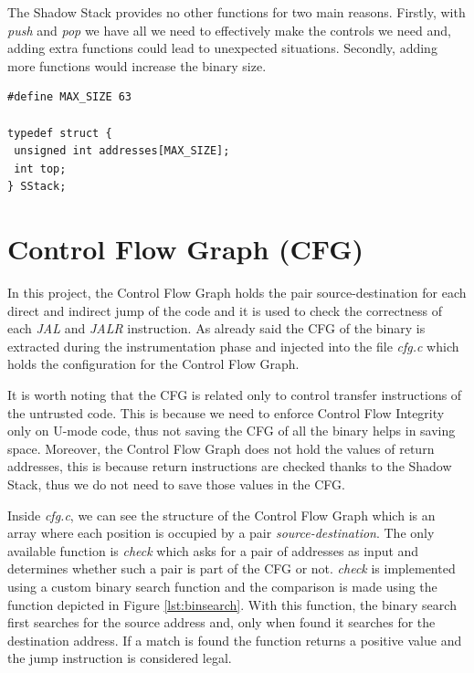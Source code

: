 The Shadow Stack provides no other functions for two main reasons. Firstly, with
\textit{push} and \textit{pop} we have all we need to effectively make the controls
we need and, adding extra functions could lead to unexpected situations. Secondly,
adding more functions would increase the binary size.

\begin{lstlisting}[style=CStyle, caption = Shadow Stack definition, label={lst:ss}]
#define MAX_SIZE 63

typedef struct {
 unsigned int addresses[MAX_SIZE];
 int top;
} SStack;
\end{lstlisting}

\section{Control Flow Graph (CFG)}
\label{sec:project_cfg}

In this project, the Control Flow Graph holds the pair source-destination for each
direct and indirect jump of the code and it is used to check the correctness of each
\textit{JAL} and \textit{JALR} instruction. As already said the CFG of the
binary is extracted during the instrumentation phase and injected into the file
\textit{cfg.c} which holds the configuration for the Control Flow Graph.

It is worth noting that the CFG is related only to control transfer instructions
of the untrusted code. This is because we need to enforce Control Flow Integrity
only on U-mode code, thus not saving the CFG of all the binary helps in saving space.
Moreover, the Control Flow Graph does not hold the values of return addresses,
this is because return instructions are checked thanks to the Shadow Stack, thus
we do not need to save those values in the CFG.

Inside \textit{cfg.c}, we can see the structure of the Control Flow Graph which is
an array where each position is occupied by a pair \textit{source-destination}. The
only available function is \textit{check} which asks for a pair of addresses as
input and determines whether such a pair is part of the CFG or not. \textit{check}
is implemented using a custom binary search function and the comparison is made
using the function depicted in Figure \ref{lst:binsearch}. With this function,
the binary search first searches for the source address and, only when found it searches
for the destination address. If a match is found the function returns a positive
value and the jump instruction is considered legal.

